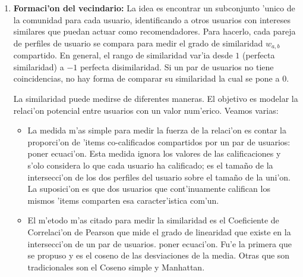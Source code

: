 \documentclass[11pt]{article}
\begin{document}
\begin{enumerate}
\item \textbf{Formaci'on del vecindario:} La idea es encontrar un subconjunto 'unico de la comunidad para cada usuario, identificando a otros usuarios con intereses similares que puedan actuar como recomendadores. Para hacerlo, cada pareja de perfiles de usuario se compara para medir el grado de similaridad $w_{a,b}$ compartido. En general, el rango de similaridad var'ia desde $1$ (perfecta similaridad) a $-1$ perfecta disimilaridad. Si un par de usuarios no tiene coincidencias, no hay forma de comparar su similaridad la cual se pone a $0$.

La similaridad puede medirse de diferentes maneras. El objetivo es modelar la relaci'on potencial entre usuarios con un valor num'erico. Veamos varias:

\begin{itemize}
\item La medida m'as simple para medir la fuerza de la relaci'on es contar la proporci'on de 'items co-calificados compartidos por un par de usuarios: poner ecuaci'on. Esta medida ignora los valores de las calificaciones y s'olo considera lo que cada usuario ha calificado; es el tama\~{n}o de la intersecci'on de los dos perfiles del usuario sobre el tama\~{n}o de la uni'on. La suposici'on es que dos usuarios que cont'inuamente califican los mismos 'items comparten esa caracter'istica com'un.
\item El m'etodo m'as citado para medir la similaridad es el Coeficiente de Correlaci'on de Pearson que mide el grado de linearidad que existe en la intersecci'on de un par de usuarios. poner ecuaci'on. Fu'e la primera que se propuso y es el coseno de las desviaciones de la media. Otras que son tradicionales son el Coseno simple y Manhattan.


\end{itemize}
\end{enumerate}
\end{document}
